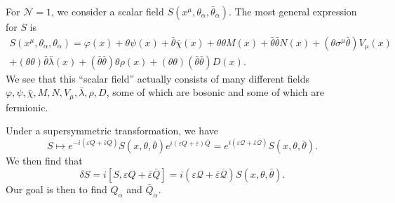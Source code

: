 \documentclass[a4paper]{article}
\begin{document}
For $\mathcal{N} = 1$, we consider a scalar field $S(x^\mu, \theta_\alpha, \bar{\theta}_{\dot{\alpha}})$. The most general expression for $S$ is
\begin{multline*}
  S(x^\mu, \theta_{\alpha}, \theta_{\dot{\alpha}}) = \varphi(x) + \theta \psi(x) + \bar{\theta} \bar{\chi}(x) + \theta \theta M(x) + \bar{\theta} \bar{\theta} N(x) + (\theta \sigma^\mu \bar{\theta}) V_\mu(x)\\
  + (\theta \theta) \bar{\theta} \bar{\lambda}(x) + (\bar{\theta} \bar{\theta}) \theta \rho(x) + (\theta \theta)(\bar{\theta} \bar{\theta}) D(x).
\end{multline*}
We see that this ``scalar field'' actually consists of many different fields $\varphi, \psi, \bar{\chi}, M, N, V_\mu, \bar{\lambda}, \rho, D$, some of which are bosonic and some of which are fermionic.

Under a supersymmetric transformation, we have
\[
  S \mapsto e^{-i(\varepsilon Q + \bar{\varepsilon} \bar{Q})} S(x, \theta, \bar{\theta}) e^{i (\varepsilon Q + \bar{\varepsilon}) \bar{Q}} = e^{i (\varepsilon \mathcal{Q} + \bar{\varepsilon} \bar{\mathcal{Q}})} S(x, \theta, \bar{\theta}).
\]
We then find that
\[
  \delta S = i [S, \varepsilon Q + \bar{\varepsilon} \bar{Q}] = i (\varepsilon \mathcal{Q} + \bar{\varepsilon} \bar{\mathcal{Q}}) S(x, \theta, \bar{\theta}).
\]
Our goal is then to find $Q_\alpha$ and $\bar{Q}_{\dot{\alpha}}$.
\end{document}

